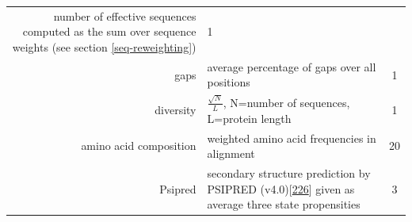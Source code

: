 \documentclass[11pt,a4paper,twoside]{book}
\theoremstyle{definition}
\theoremstyle{definition}
\theoremstyle{remark}
\begin{document}
\begin{longtable}[]{@{}rlc@{}}
\begin{minipage}[t]{0.50\columnwidth}
number of effective sequences computed as the sum over sequence weights
(see section \ref{seq-reweighting})\strut
\end{minipage} & \begin{minipage}[t]{0.18\columnwidth}\centering\strut
1\strut
\end{minipage}\tabularnewline
\begin{minipage}[t]{0.23\columnwidth}\raggedleft\strut
gaps\strut
\end{minipage} & \begin{minipage}[t]{0.50\columnwidth}\raggedright\strut
average percentage of gaps over all positions\strut
\end{minipage} & \begin{minipage}[t]{0.18\columnwidth}\centering\strut
1\strut
\end{minipage}\tabularnewline
\begin{minipage}[t]{0.23\columnwidth}\raggedleft\strut
diversity\strut
\end{minipage} & \begin{minipage}[t]{0.50\columnwidth}\raggedright\strut
\(\frac{\sqrt{N}}{L}\), N=number of sequences, L=protein length\strut
\end{minipage} & \begin{minipage}[t]{0.18\columnwidth}\centering\strut
1\strut
\end{minipage}\tabularnewline
\begin{minipage}[t]{0.23\columnwidth}\raggedleft\strut
amino acid composition\strut
\end{minipage} & \begin{minipage}[t]{0.50\columnwidth}\raggedright\strut
weighted amino acid frequencies in alignment\strut
\end{minipage} & \begin{minipage}[t]{0.18\columnwidth}\centering\strut
20\strut
\end{minipage}\tabularnewline
\begin{minipage}[t]{0.23\columnwidth}\raggedleft\strut
Psipred\strut
\end{minipage} & \begin{minipage}[t]{0.50\columnwidth}\raggedright\strut
secondary structure prediction by PSIPRED
(v4.0){[}\protect\hyperlink{ref-Jones1999}{226}{]} given as average
three state propensities\strut
\end{minipage} & \begin{minipage}[t]{0.18\columnwidth}\centering\strut
3\strut
\end{minipage}\tabularnewline

\end{longtable}
\end{document}
